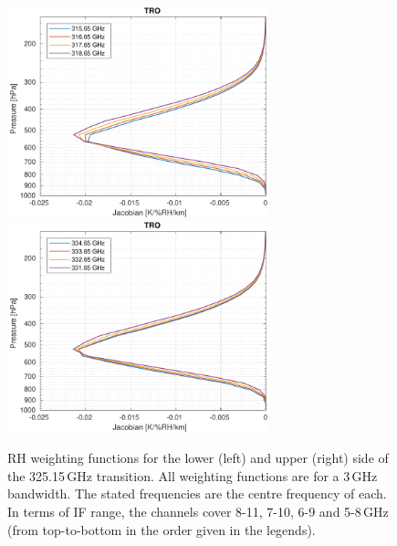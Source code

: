 \documentclass[12pt]{article}
\begin{document}
\begin{figure}[!p]
  \centering
  \includegraphics[height=61mm]{fascod_wf_325l_tro}\hspace{5mm}%
  \includegraphics[clip,trim=43 0 0 0,height=61mm]{fascod_wf_325u_tro}
  \caption{RH weighting functions for the lower (left) and upper (right) side
    of the 325.15\,GHz transition. All weighting functions are for a 3\,GHz
    bandwidth. The stated frequencies are the centre frequency of each. In
    terms of IF range, the channels cover 8-11, 7-10, 6-9 and 5-8\,GHz (from
    top-to-bottom in the order given in the legends). }
  \label{fig:wfuns:325ul}
\end{figure}
\end{document}
